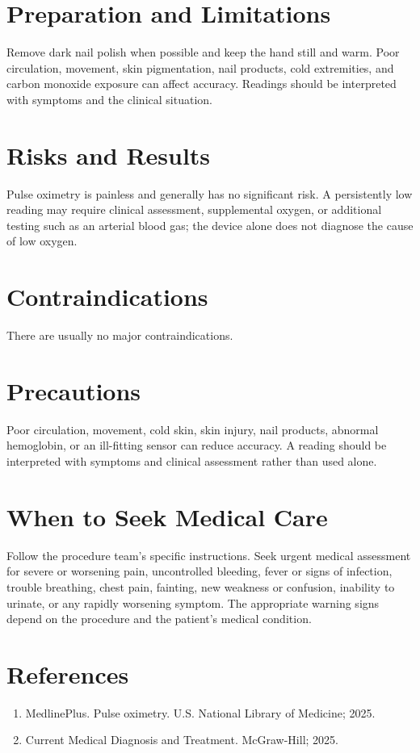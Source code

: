 \section*{Preparation and Limitations}
Remove dark nail polish when possible and keep the hand still and warm. Poor circulation, movement, skin pigmentation, nail products, cold extremities, and carbon monoxide exposure can affect accuracy. Readings should be interpreted with symptoms and the clinical situation.

\section*{Risks and Results}
Pulse oximetry is painless and generally has no significant risk. A persistently low reading may require clinical assessment, supplemental oxygen, or additional testing such as an arterial blood gas; the device alone does not diagnose the cause of low oxygen.

\section*{Contraindications}
There are usually no major contraindications.

\section*{Precautions}
Poor circulation, movement, cold skin, skin injury, nail products, abnormal hemoglobin, or an ill-fitting sensor can reduce accuracy. A reading should be interpreted with symptoms and clinical assessment rather than used alone.

\section*{When to Seek Medical Care}
Follow the procedure team's specific instructions. Seek urgent medical assessment for severe or worsening pain, uncontrolled bleeding, fever or signs of infection, trouble breathing, chest pain, fainting, new weakness or confusion, inability to urinate, or any rapidly worsening symptom. The appropriate warning signs depend on the procedure and the patient's medical condition.

\section*{References}
\begin{enumerate}
  \item MedlinePlus. Pulse oximetry. U.S. National Library of Medicine; 2025.
  \item Current Medical Diagnosis and Treatment. McGraw-Hill; 2025.
\end{enumerate}
\clearpage

